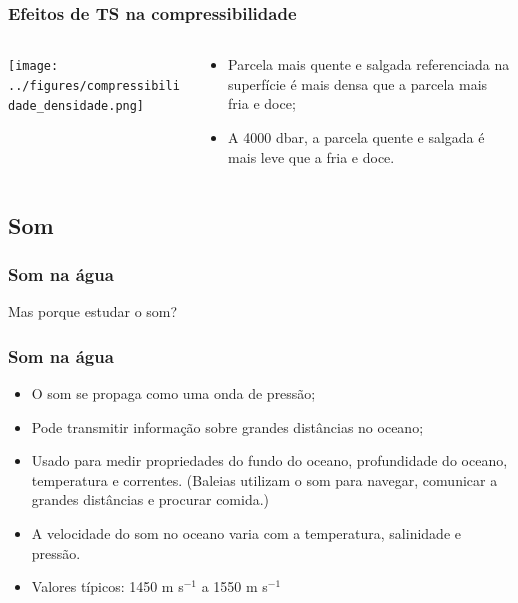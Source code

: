 \begin{frame}
\frametitle{Efeitos de TS na compressibilidade}
  \begin{columns}
    \begin{column}{0.5\textwidth}
      \begin{center}
        \texttt{[image: ../figures/compressibilidade\_densidade.png]}
      \end{center}
    \end{column}

    \begin{column}{0.5\textwidth}
      \small{
      \begin{itemize}[<+-| alert@+>]
        \item Parcela mais quente e salgada referenciada na superfície é mais
              densa que a parcela mais fria e doce;
        \item A 4000 dbar, a parcela quente e salgada é mais leve que a fria e
              doce.
      \end{itemize}
      }
    \end{column}
  \end{columns}
\end{frame}


\subsection{Som}
\begin{frame}
\frametitle{Som na água}
    \begin{block}{}
        Mas porque estudar o som?
    \end{block}
\end{frame}


\begin{frame}
\frametitle{Som na água}
    \footnotesize{
    \begin{itemize}
    \item O som se propaga como uma onda de pressão;
    \item Pode transmitir informação sobre grandes distâncias no oceano;
    \item Usado para medir propriedades do fundo do oceano, profundidade do
          oceano, temperatura e correntes. (Baleias utilizam o som para
          navegar, comunicar a grandes distâncias e procurar comida.)
    \item A velocidade do som no oceano varia com a temperatura, salinidade e
          pressão.
    \item Valores típicos: 1450 m s$^{-1}$ a 1550 m s$^{-1}$
    \end{itemize}
    }
\end{frame}


